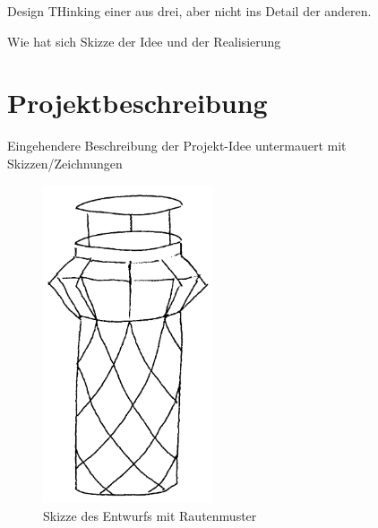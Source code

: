         Design THinking einer aus drei, aber nicht ins Detail der anderen.
        
        Wie hat sich Skizze der Idee und der Realisierung

\chapter{Projektbeschreibung}
    
    Eingehendere Beschreibung der Projekt-Idee untermauert mit
    Skizzen/Zeichnungen

    \begin{figure}[h]
        \begin{center}
            \includegraphics[width=5cm]{media/01_project/bin.png}
        \end{center}
        \caption{Skizze des Entwurfs mit Rautenmuster}
        \label{fig:bin_1}
    \end{figure}